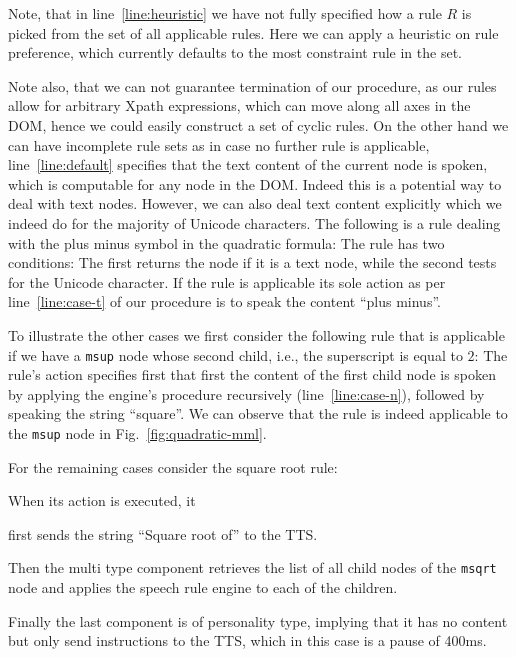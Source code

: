 \documentclass{sig-alternate}
\begin{document}
Note, that in line~\ref{line:heuristic} we have not fully specified how a rule $R$ is
picked from the set of all applicable rules. Here we can apply a heuristic on
rule preference, which currently defaults to the most constraint rule in the
set.

Note also, that we can not guarantee termination of our procedure, as our rules
allow for arbitrary Xpath expressions, which can move along all axes in the DOM,
hence we could easily construct a set of cyclic rules. On the other hand we can
have incomplete rule sets as in case no further rule is applicable,
line~\ref{line:default} specifies that the text content of the current node is
spoken, which is computable for any node in the DOM. Indeed this is a potential
way to deal with text nodes. However, we can also deal text content explicitly
which we indeed do for the majority of Unicode characters.  The following is a
rule dealing with the plus minus symbol in the quadratic formula:
 The rule has two
conditions: The first returns the node if it is a text node, while the second
tests for the Unicode character. If the rule is applicable its sole action as
per line~\ref{line:case-t} of our procedure is to speak the content
``plus minus''.

To illustrate the other cases we first consider the following rule that is
applicable if we have a \texttt{msup} node whose second child, i.e., the superscript is
equal to $2$:  The rule's action specifies first that first the content of the
first child node is spoken by applying the engine's procedure recursively
(line~\ref{line:case-n}), followed by speaking the string ``square''.  We can
observe that the rule is indeed applicable to the \texttt{msup} node in
Fig.~\ref{fig:quadratic-mml}.

For the remaining cases  consider the square root rule:

\noindent When its action is executed, it
\begin{inparaenum}[(1)]
\item first sends the string ``Square root of'' to the TTS.
\item Then the multi type component retrieves the list of all child nodes of the
  \texttt{msqrt} node and applies the speech rule engine to each of the children.
\item Finally the last component is of personality type, implying that it
  has no content but only send instructions to the TTS, which in this case is a
  pause of 400ms.
\end{inparaenum}
\end{document}
